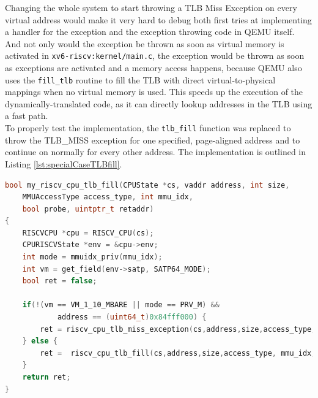 Changing the whole system to start throwing a TLB Miss Exception on every virtual address would
make it very hard to debug both first tries at implementing a handler for the exception and the
exception throwing code in QEMU itself.\\
And not only would the exception be thrown as soon as virtual memory is activated in
\texttt{xv6-riscv:kernel/main.c}, the exception would be thrown
as soon as exceptions are activated and a memory access happens, because QEMU also uses the
\texttt{fill\_tlb} routine to fill the TLB with direct
virtual-to-physical mappings when no virtual memory is used. This speeds up the execution of
the dynamically-translated code, as it can directly
lookup addresses in the TLB using a fast path.\\ 
To properly test the implementation, the \texttt{tlb\_fill} function was replaced to throw the
TLB\_MISS exception for
one specified, page-aligned address and to continue on normally for every other address.
The implementation is outlined
in Listing \ref{lst:specialCaseTLBfill}.



\begin{lstlisting}[language=c,float=h!,
    caption={Alternative Implementation for the RISC-V tlb\_fill function with a special case to
    start testing TLB Miss Handler implementations.\\
    In line 11, a conditional branch is used to only trigger the exception when neither the
    Virtual Memory (as set in the \texttt{satp} \texttt{MODE} field) is bare nor the priviledge
    mode is the machine mode.\\
    If the virtual address is the hardcoded one, a TLB Miss exception is thrown, otherwise the
    original functions is called, which will perform a page table walk to find the mapping.},
    label={lst:specialCaseTLBfill}]
bool my_riscv_cpu_tlb_fill(CPUState *cs, vaddr address, int size,
    MMUAccessType access_type, int mmu_idx,
    bool probe, uintptr_t retaddr)
{
    RISCVCPU *cpu = RISCV_CPU(cs);
    CPURISCVState *env = &cpu->env;
    int mode = mmuidx_priv(mmu_idx);
    int vm = get_field(env->satp, SATP64_MODE);
    bool ret = false;

    if(!(vm == VM_1_10_MBARE || mode == PRV_M) &&
            address == (uint64_t)0x84fff000) {
        ret = riscv_cpu_tlb_miss_exception(cs,address,size,access_type, mmu_idx, probe, retaddr);
    } else {
        ret =  riscv_cpu_tlb_fill(cs,address,size,access_type, mmu_idx, probe, retaddr);
    }
    return ret;
}
\end{lstlisting}


